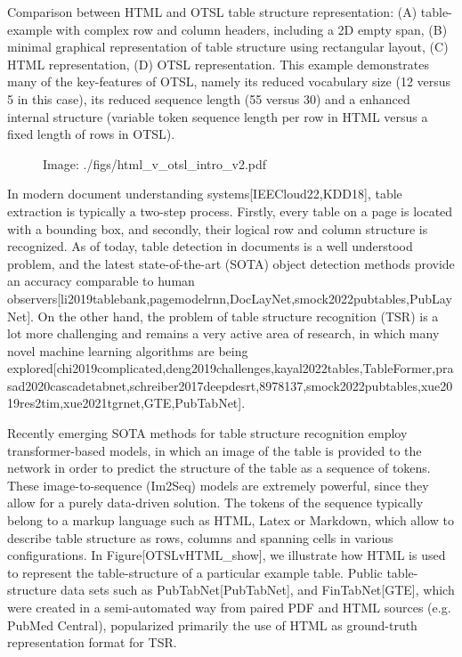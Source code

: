 \documentclass[11pt,a4paper]{article}
\begin{document}
Comparison between HTML and OTSL table structure representation: (A) table-example with complex row and column headers, including a 2D empty span, (B) minimal graphical representation of table structure using rectangular layout, (C) HTML representation, (D) OTSL representation. This example demonstrates many of the key-features of OTSL, namely its reduced vocabulary size (12 versus 5 in this case), its reduced sequence length (55 versus 30) and a enhanced internal structure (variable token sequence length per row in HTML versus a fixed length of rows in OTSL).

\begin{figure}[h]
\caption{Image: ./figs/html\_v\_otsl\_intro\_v2.pdf}
\end{figure}

In modern document understanding systems[IEECloud22,KDD18], table extraction is typically a two-step process. Firstly, every table on a page is located with a bounding box, and secondly, their logical row and column structure is recognized. As of today, table detection in documents is a well understood problem, and the latest state-of-the-art (SOTA) object detection methods provide an accuracy comparable to human observers[li2019tablebank,pagemodelrnn,DocLayNet,smock2022pubtables,PubLayNet]. On the other hand, the problem of table structure recognition (TSR) is a lot more challenging and remains a very active area of research, in which many novel machine learning algorithms are being explored[chi2019complicated,deng2019challenges,kayal2022tables,TableFormer,prasad2020cascadetabnet,schreiber2017deepdesrt,8978137,smock2022pubtables,xue2019res2tim,xue2021tgrnet,GTE,PubTabNet].

Recently emerging SOTA methods for table structure recognition employ transformer-based models, in which an image of the table is provided to the network in order to predict the structure of the table as a sequence of tokens. These image-to-sequence (Im2Seq) models are extremely powerful, since they allow for a purely data-driven solution. The tokens of the sequence typically belong to a markup language such as HTML, Latex or Markdown, which allow to describe table structure as rows, columns and spanning cells in various configurations. In Figure[OTSLvHTML\_show], we illustrate how HTML is used to represent the table-structure of a particular example table. Public table-structure data sets such as PubTabNet[PubTabNet], and FinTabNet[GTE], which were created in a semi-automated way from paired PDF and HTML sources (e.g. PubMed Central), popularized primarily the use of HTML as ground-truth representation format for TSR.
\end{document}
